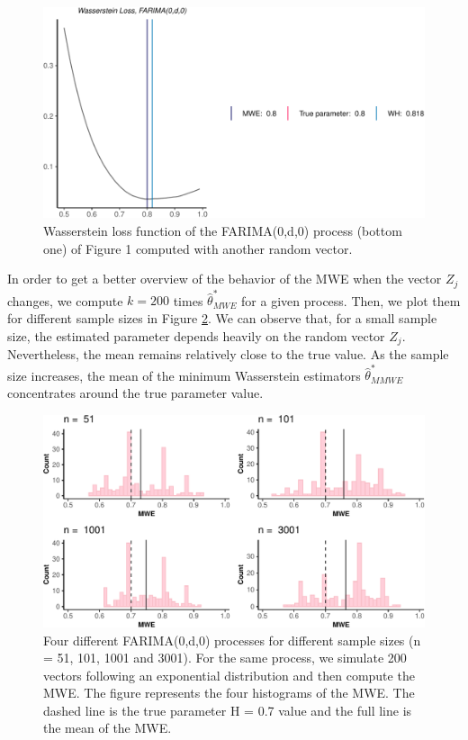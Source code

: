 \documentclass[
  11pt,
]{article}
\begin{document}
\begin{figure}[h]

{\centering \includegraphics[width=0.55\linewidth]{Master_thesis_V1_files/figure-latex/wasserstein_z-1} 

}

\caption{Wasserstein loss function of the FARIMA(0,d,0) process (bottom one) of Figure 1 computed with another random vector.}\label{fig:wasserstein_z}
\end{figure}

In order to get a better overview of the behavior of the MWE when the
vector \(Z_j\) changes, we compute \(k = 200\) times
\(\hat \theta^*_{MWE}\) for a given process. Then, we plot them for
different sample sizes in Figure \ref{fig:MWE_n}. We can observe that,
for a small sample size, the estimated parameter depends heavily on the
random vector \(Z_j\). Nevertheless, the mean remains relatively close
to the true value. As the sample size increases, the mean of the minimum
Wasserstein estimators \(\hat \theta^*_{MMWE}\) concentrates around the
true parameter value.

\begin{figure}[h]

{\centering \includegraphics[width=0.7\linewidth]{Master_thesis_V1_files/figure-latex/MWE_n-1} 

}

\caption{Four different FARIMA(0,d,0) processes for different sample sizes (n = 51, 101, 1001 and 3001). For the same process, we simulate 200 vectors following an exponential distribution and then compute the MWE. The figure represents the four histograms of the MWE. The dashed line is the true parameter H = 0.7 value and the full line is the mean of the MWE.}\label{fig:MWE_n}
\end{figure}
\end{document}
